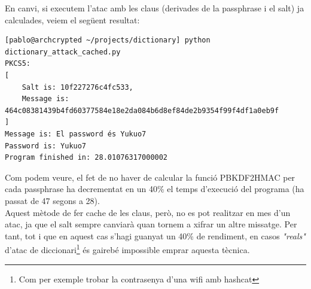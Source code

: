 \documentclass[12pt, letterpaper]{article}
\begin{document}
En canvi, si executem l'atac amb les claus (derivades de la passphrase i el salt) ja calculades, veiem el següent resultat:
\begin{verbatim}
[pablo@archcrypted ~/projects/dictionary] python dictionary_attack_cached.py
PKCS5: 
[
	Salt is: 10f227276c4fc533,
	Message is: 464c08381439b4fd60377584e18e2da084b6d8ef84de2b9354f99f4df1a0eb9f
]
Message is: El password és Yukuo7
Password is: Yukuo7
Program finished in: 28.01076317000002
\end{verbatim}

Com podem veure, el fet de no haver de calcular la funció PBKDF2HMAC per cada passphrase ha decrementat en un 40\% el temps d'execució del programa (ha passat de 47 segons a 28).\\

Aquest mètode de fer cache de les claus, però, no es pot realitzar en mes d'un atac, ja que el salt sempre canviarà quan tornem a xifrar un altre missatge. Per tant, tot i que en aquest cas s'hagi guanyat un 40\% de rendiment, en casos \textit{"reals"} d'atac de diccionari\footnote{Com per exemple trobar la contrasenya d'una wifi amb hashcat} és gairebé impossible emprar aquesta tècnica.
\end{document}
